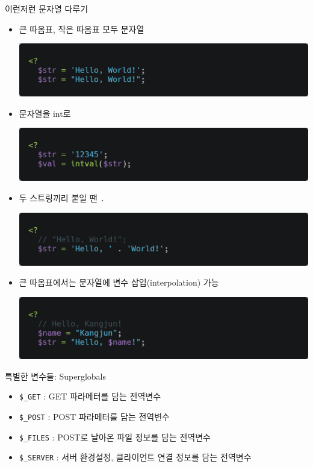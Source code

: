 \documentclass{beamer}
\begin{document}
    \begin{frame}{이런저런 문자열 다루기}
        \begin{itemize}
            \item 큰 따옴표, 작은 따옴표 모두 문자열
                  
            \includegraphics[height=0.1\textwidth]{Images/php3.png}
            \item 문자열을 int로
                  
            \includegraphics[height=0.1\textwidth]{Images/php4.png}
            \item 두 스트링끼리 붙일 땐 \texttt{.}
                  
            \includegraphics[height=0.1\textwidth]{Images/php5.png}
            \item 큰 따옴표에서는 문자열에 변수 삽입(interpolation) 가능
                  
            \includegraphics[height=0.1\textwidth]{Images/php6.png}
        \end{itemize}
    \end{frame}

    \begin{frame}{특별한 변수들: Superglobals}
        \begin{itemize}
            \item \texttt{\$\_GET} : GET 파라메터를 담는 전역변수
            \item \texttt{\$\_POST} : POST 파라메터를 담는 전역변수
            \item \texttt{\$\_FILES} : POST로 날아온 파일 정보를 담는 전역변수
            \item \texttt{\$\_SERVER} : 서버 환경설정, 클라이언트 연결 정보를 담는 전역변수
        \end{itemize}
    \end{frame}
\end{document}
